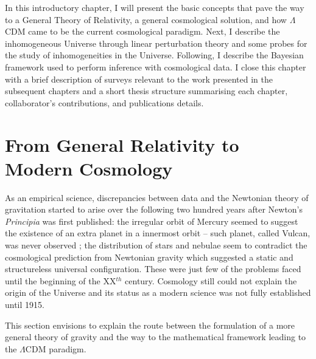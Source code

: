 \qquad In this introductory chapter, I will present the basic concepts that pave the way to a General Theory of Relativity, a general cosmological solution, and how $\Lambda$CDM came to be the current cosmological paradigm. Next, I describe the inhomogeneous Universe through linear perturbation theory and some probes for the study of inhomogeneities in the Universe. Following, I describe the Bayesian framework used to perform inference with cosmological data. I close this chapter with a brief description of surveys relevant to the work presented in the subsequent chapters and a short thesis structure summarising each chapter, collaborator's contributions, and publications details. 

\section{From General Relativity to Modern Cosmology} \label{Sec:Intro:GR}
As an empirical science, discrepancies between data and the Newtonian theory of gravitation started to arise over the following two hundred years after Newton's \textit{Principia} was first published: the irregular orbit of Mercury seemed to suggest the existence of an extra planet in a innermost orbit -- such planet, called Vulcan, was never observed \citep{1859Mercury}; the distribution of stars and nebulae seem to contradict the cosmological prediction from Newtonian gravity which suggested a static and structureless universal configuration. These were just few of the problems faced until the beginning of the XX$^{th}$ century. Cosmology still could not explain the origin of the Universe and its status as a modern science was not fully established until 1915.

\qquad This section envisions to explain the route between the formulation of a more general theory of gravity and the way to the mathematical framework leading to the $\Lambda$CDM paradigm.


